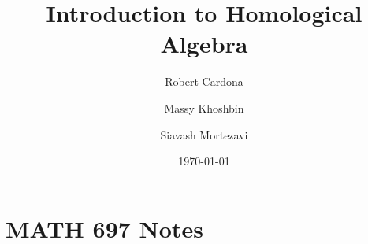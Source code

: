\documentclass[8pt]{amsart}
\theoremstyle{plain}%
\theoremstyle{definition}
\theoremstyle{remark}
\numberwithin{equation}{section}
\begin{document}
\title[MATH 697]{Introduction to Homological Algebra}


\author{
	Robert Cardona %
	\and
	Massy Khoshbin %
	\and
	Siavash Mortezavi %
}


\address{Department of Mathematics \\ California State University Long Beach}

\date{\today}


\maketitle

\setcounter{section}{0}
\section{MATH 697 Notes}
\end{document}
